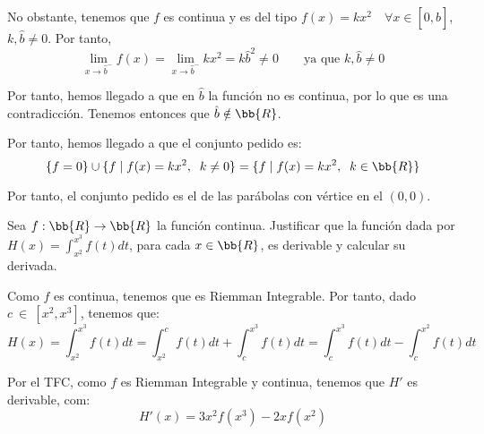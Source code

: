 \begin{ejercicio}
\begin{itemize}
        No obstante, tenemos que $f$ es continua y es del tipo $f(x)=kx^2\quad \forall x\in [0,\hat{b}]$, $k,\hat{b}\neq 0$. Por tanto,
        \begin{equation*}
            \lim_{x\to \hat{b}^-} f(x)= \lim_{x\to \hat{b}^-} kx^2 = k\hat{b}^2 \neq 0 \qquad \text{ya que }k,\hat{b}\neq 0
        \end{equation*}
        

        Por tanto, hemos llegado a que en $\hat{b}$ la función no es continua, por lo que es una contradicción. Tenemos entonces que $\hat{b}\notin \bb{R}$.

        Por tanto, hemos llegado a que el conjunto pedido es:
        \begin{equation*}
            \{f=0\}\cup \{f\mid f(x)=kx^2,\;\;k\neq 0\} = \{f\mid f(x)=kx^2,\;\;k\in \bb{R}\}
        \end{equation*}

        Por tanto, el conjunto pedido es el de las parábolas con vértice en el $(0,0)$.

        
    \end{itemize}
    
\end{ejercicio}

\begin{ejercicio}
    Sea $f:\bb{R}\to \bb{R}$ la función continua. Justificar que la función dada por $H(x)=\int_{x^2}^{x^3}f(t)dt$, para cada $x\in \bb{R}$, es derivable y calcular su derivada.

    Como $f$ es continua, tenemos que es Riemman Integrable. Por tanto, dado $c~\in~[x^2,x^3]$, tenemos que:
    \begin{equation*}
        H(x)=\int_{x^2}^{x^3}f(t)dt =\int_{x^2}^{c}f(t)dt + \int_{c}^{x^3}f(t)dt = \int_{c}^{x^3}f(t)dt - \int_{c}^{x^2}f(t)dt
    \end{equation*}

    Por el TFC, como $f$ es Riemman Integrable y continua, tenemos que $H'$ es derivable, com:
    \begin{equation*}
            H'(x) = 3x^2f(x^3) -2xf(x^2)
    \end{equation*}
    
\end{ejercicio}

